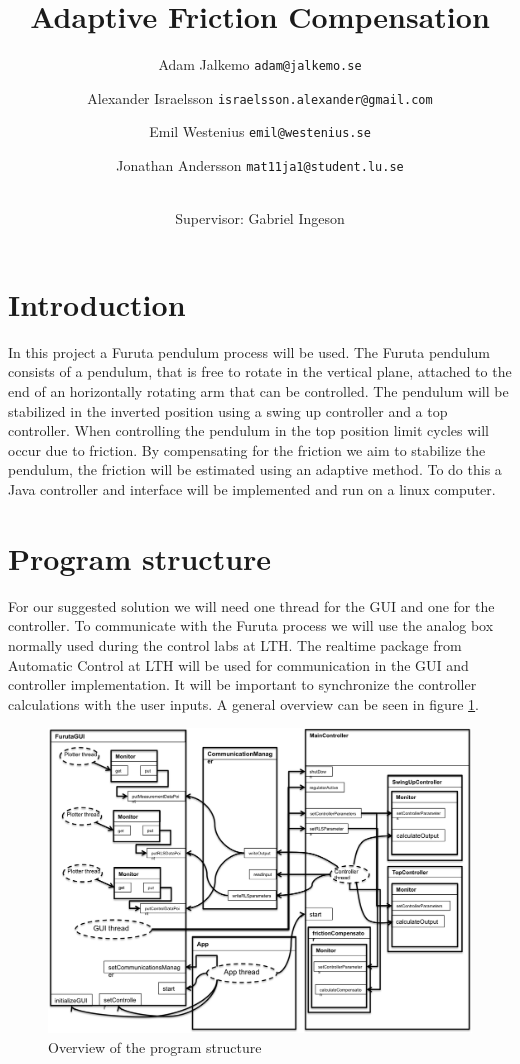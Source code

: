 \documentclass[10pt,a4paper]{article}
\author{Adam Jalkemo \texttt{adam@jalkemo.se} \and
Alexander Israelsson \texttt{israelsson.alexander@gmail.com} \and
Emil Westenius \texttt{emil@westenius.se} \and
Jonathan Andersson \texttt{mat11ja1@student.lu.se}
\and 
\\
Supervisor: Gabriel Ingeson}
\begin{document}
\title{Adaptive Friction Compensation}

\maketitle
\pagebreak
\section{Introduction}
In this project a Furuta pendulum process will be used. The Furuta pendulum consists of a pendulum, that is free to rotate in the vertical plane, attached to the end of an horizontally rotating arm that can be controlled. The pendulum will be stabilized in the inverted position using a swing up controller and a top controller. When controlling the pendulum in the top position limit cycles will occur due to friction. By compensating for the friction we aim to stabilize the pendulum, the friction will be estimated using an adaptive method. To do this a Java controller and interface will be implemented and run on a linux computer.
\section{Program structure}
For our suggested solution we will need one thread for the GUI and one for the controller. To communicate with the Furuta process we will use the analog box normally used during the control labs at LTH. The realtime package from Automatic Control at LTH will be used for communication in the GUI and controller implementation. It will be important to synchronize the controller calculations with the user inputs. A general overview can be seen in figure \ref{fig:uml}.

\begin{figure}[!htb]
\begin{center}
\includegraphics[width=1\textwidth]{notUml.png}
\caption{Overview of the program structure}
\label{fig:uml}
\end{center}
\end{figure}
\end{document}
